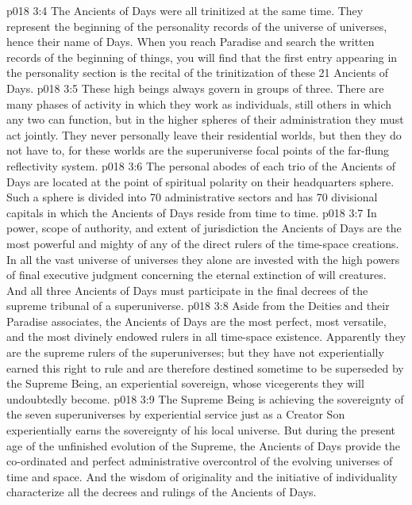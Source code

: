 \vs p018 3:4 \pc The Ancients of Days were all trinitized at the same time. They represent the beginning of the personality records of the universe of universes, hence their name  of Days. When you reach Paradise and search the written records of the beginning of things, you will find that the first entry appearing in the personality section is the recital of the trinitization of these 21 Ancients of Days.
\vs p018 3:5 \pc These high beings always govern in groups of three. There are many phases of activity in which they work as individuals, still others in which any two can function, but in the higher spheres of their administration they must act jointly. They never personally leave their residential worlds, but then they do not have to, for these worlds are the superuniverse focal points of the far\hyp{}flung reflectivity system.
\vs p018 3:6 The personal abodes of each trio of the Ancients of Days are located at the point of spiritual polarity on their headquarters sphere. Such a sphere is divided into 70 administrative sectors and has 70 divisional capitals in which the Ancients of Days reside from time to time.
\vs p018 3:7 In power, scope of authority, and extent of jurisdiction the Ancients of Days are the most powerful and mighty of any of the direct rulers of the time\hyp{}space creations. In all the vast universe of universes they alone are invested with the high powers of final executive judgment concerning the eternal extinction of will creatures. And all three Ancients of Days must participate in the final decrees of the supreme tribunal of a superuniverse.
\vs p018 3:8 \pc Aside from the Deities and their Paradise associates, the Ancients of Days are the most perfect, most versatile, and the most divinely endowed rulers in all time\hyp{}space existence. Apparently they are the supreme rulers of the superuniverses; but they have not experientially earned this right to rule and are therefore destined sometime to be superseded by the Supreme Being, an experiential sovereign, whose vicegerents they will undoubtedly become.
\vs p018 3:9 The Supreme Being is achieving the sovereignty of the seven superuniverses by experiential service just as a Creator Son experientially earns the sovereignty of his local universe. But during the present age of the unfinished evolution of the Supreme, the Ancients of Days provide the co\hyp{}ordinated and perfect administrative overcontrol of the evolving universes of time and space. And the wisdom of originality and the initiative of individuality characterize all the decrees and rulings of the Ancients of Days.
